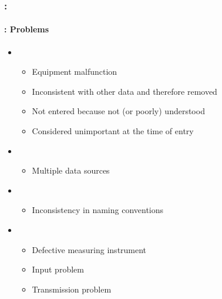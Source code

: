 \documentclass[xcolor=table]{beamer}
\begin{document}
\begin{frame}
	\frametitle{\insertshortsubtitle: \insertsection}
	\framesubtitle{\insertsubsection: Problems}
	
	\begin{itemize}
		\item {}
		\begin{itemize}
			\item Equipment malfunction
			\item Inconsistent with other data and therefore removed
			\item Not entered because not (or poorly) understood
			\item Considered unimportant at the time of entry
		\end{itemize}
		\item {}
		\begin{itemize}
			\item Multiple data sources
		\end{itemize}
		\item {}
		\begin{itemize}
			\item Inconsistency in naming conventions
		\end{itemize}
		\item {}
		\begin{itemize}
			\item Defective measuring instrument
			\item Input problem
			\item Transmission problem
		\end{itemize}
	\end{itemize}
	
\end{frame}
\end{document}
